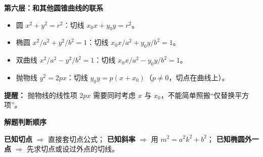 \begin{explanationbox}
\medskip
\textbf{\textcolor{CExplanation}{第六层：和其他圆锥曲线的联系}}
\begin{itemize}[leftmargin=*, itemsep=0.3em]
 \item 圆 $x^2+y^2=r^2$：切线 $x_0x+y_0y=r^2$。
 \item 椭圆 $x^2/a^2+y^2/b^2=1$：切线 $x_0x/a^2+y_0y/b^2=1$。
 \item 双曲线 $x^2/a^2-y^2/b^2=1$：切线 $x_0x/a^2-y_0y/b^2=1$。
 \item 抛物线 $y^2=2px$：切线 $y_0y=p(x+x_0)$（$p\ne0$，切点在曲线上）。
\end{itemize}
\textbf{提醒：} 抛物线的线性项 $2px$ 需要同时考虑 $x$ 与 $x_0$，不能简单照搬“仅替换平方项”。

\medskip
\textbf{\textcolor{CExplanation}{解题判断顺序}}

\textbf{已知切点} $\Rightarrow$ 直接套切点公式；\quad
\textbf{已知斜率} $\Rightarrow$ 用 $m^2=a^2k^2+b^2$；\quad
\textbf{已知椭圆外一点} $\Rightarrow$ 先求切点或设过外点的切线。
\end{explanationbox}
